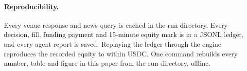 \paragraph{Reproducibility.} Every venue response and news query is cached in the run directory. Every decision, fill, funding payment and 15-minute equity mark is in a JSONL ledger, and every agent report is saved. Replaying the ledger through the engine reproduces the recorded equity to within \ReplayDrift{} USDC. One command rebuilds every number, table and figure in this paper from the run directory, offline.
